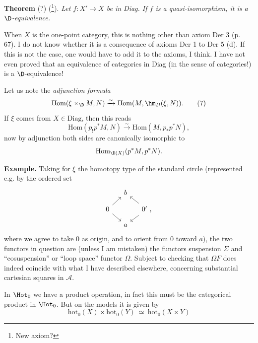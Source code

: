 \textbf{Theorem} (?) (\footnote{New axiom?}). \textit{Let $f : X' \longrightarrow X$ be in Diag. If $f$ is a quasi-isomorphism, it is a $\D$-equivalence.}

When $X$ is the one-point category, this is nothing other than axiom Der 3 (p. 67). I do not know whether it is a consequence of axioms Der 1 to Der 5 (d). If this is not the case, one would have to add it to the axioms, I think. I have not even proved that an equivalence of categories in Diag (in the sense of categories!) is a $\D$-equivalence!

Let us note the \textit{adjunction formula}
\[
\mathrm{Hom}(\xi \times_{\D} M, N) \xrightarrow{\sim} \mathrm{Hom}(M, \hm_D(\xi, N)).
\tag*{(7)}
\] %
If $\xi$ comes from $X \in \mathrm{Diag}$, then this reads
\[
\mathrm{Hom}(p_!p^*M, N) \xrightarrow{\sim} \mathrm{Hom}(M, p_*p^*N),
\tag*{(8)}
\]
now by adjunction both sides are canonically isomorphic to
\[
\mathrm{Hom}_{\D(X)}(p^*M, p^*N).
\]

\textbf{Example.} Taking for $\xi$ the homotopy type of the standard circle (represented e.g. by the ordered set
\[
\begin{tikzcd}[row sep=small, column sep=small]
 & b & \\
0 \arrow[ur] \arrow[dr] & & 0' \arrow[ul] \arrow[dl] \ , \\
 & a &
\end{tikzcd}
\]
where we agree to take 0 as origin, and to orient from 0 toward $a$), the two functors in question are (unless I am mistaken) the functors suspension $\Sigma$ and ``cosuspension'' or ``loop space'' functor $\Omega$. Subject to checking that $\Omega F$ does indeed coincide with what I have described elsewhere, concerning substantial cartesian squares in $\mathcal{A}$.

In $\Hot_0$ we have a product operation, in fact this must be the categorical product in $\Hot_0$. But on the models it is given by
\[
\mathrm{hot}_0(X) \times \mathrm{hot}_0(Y) \ \simeq \ \mathrm{hot}_0(X \times Y)
\tag*{(8)}
\] %